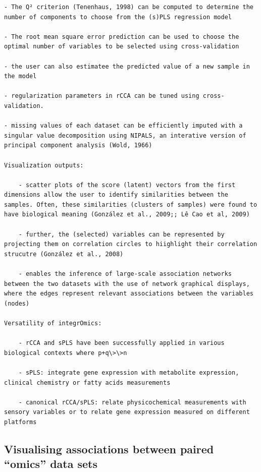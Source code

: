 \documentclass[
]{book}
\begin{document}
\begin{verbatim}
- The Q² criterion (Tenenhaus, 1998) can be computed to determine the number of components to choose from the (s)PLS regression model

- The root mean square error prediction can be used to choose the optimal number of variables to be selected using cross-validation

- the user can also estimatee the predicted value of a new sample in the model

- regularization parameters in rCCA can be tuned using cross-validation.

- missing values of each dataset can be efficiently imputed with a singular value decomposition using NIPALS, an interative version of principal component analysis (Wold, 1966)

Visualization outputs:

    - scatter plots of the score (latent) vectors from the first dimensions allow the user to identify similarities between the samples. Often, these similarities (clusters of samples) were found to have biological meaning (González et al., 2009;; Lê Cao et al, 2009)

    - further, the (selected) variables can be represented by projecting them on correlation circles to hiighlight their correlation strucutre (González et al., 2008)

    - enables the inference of large-scale association networks between the two datasets with the use of network graphical displays, where the edges represent relevant associations between the variables (nodes)

Versatility of integrOmics:

    - rCCA and sPLS have been successfully applied in various biological contexts where p+q\>\>n

    - sPLS: integrate gene expression with metabolite expression, clinical chemistry or fatty acids measurements

    - canonical rCCA/sPLS: relate physicochemical measurements with sensory variables or to relate gene expression measured on different platforms
\end{verbatim}

\hypertarget{visualising-associations-between-paired-omics-data-sets}{%
\subsection{Visualising associations between paired ``omics'' data sets}\label{visualising-associations-between-paired-omics-data-sets}}
\end{document}
